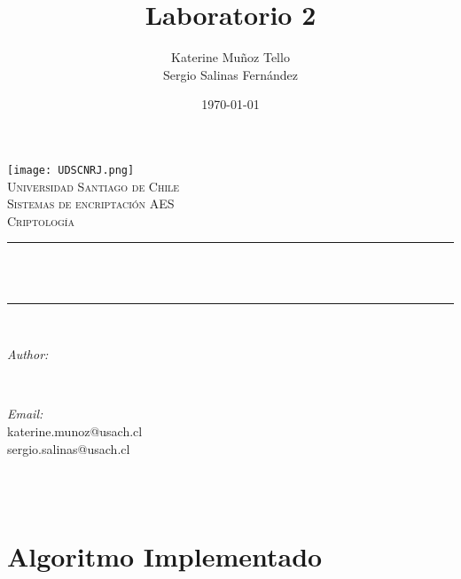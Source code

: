 \documentclass[12pt]{article}
\title{Laboratorio 2}								%
\author{Katerine Mu\~noz Tello \\
Sergio Salinas Fern\'andez}								%
\date{\today}											%
\makeatletter
\let\thetitle\@title
\let\theauthor\@author
\let\thedate\@date
\makeatother
\begin{document}

\begin{titlepage}
	\centering

    \texttt{[image: UDSCNRJ.png]}\\[1.0 cm]	%
    \textsc{\LARGE Universidad Santiago de Chile}\\[2.0 cm]	%
	\textsc{\Large Sistemas de encriptaci\'on AES}\\[0.5 cm]				%
	\textsc{\large Criptolog\'ia}\\[0.5 cm]				%
	\rule{\linewidth}{0.2 mm} \\[0.4 cm]
	{ \huge \bfseries \thetitle}\\
	\rule{\linewidth}{0.2 mm} \\[1.5 cm]
	
	\begin{minipage}{0.4\textwidth}
		\begin{flushleft} \large
			\emph{Author:}\\
			\theauthor
			\end{flushleft}
			\end{minipage}~
			\begin{minipage}{0.4\textwidth}
			\begin{flushright} \large
			\emph{Email:} \\
			katerine.munoz@usach.cl \\
            sergio.salinas@usach.cl  %
		\end{flushright}
	\end{minipage}\\[2 cm]
	
	{\large \thedate}\\[2 cm]
 
	\vfill
	
\end{titlepage}


\tableofcontents
\pagebreak



\section{Algoritmo Implementado}
\end{document}

